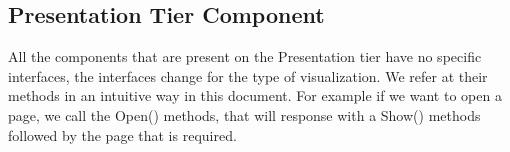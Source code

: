 \documentclass[../../../../dd.tex]{subfiles}
\begin{document}
		\subsection{Presentation Tier Component}
		All the components that are present on the Presentation tier have no specific interfaces, the interfaces change for the type of visualization. We refer at their methods in an intuitive way in this document. For example if we want to open a page, we call the Open() methods, that will response with a Show() methods followed by the page that is required.
		
\end{document}

